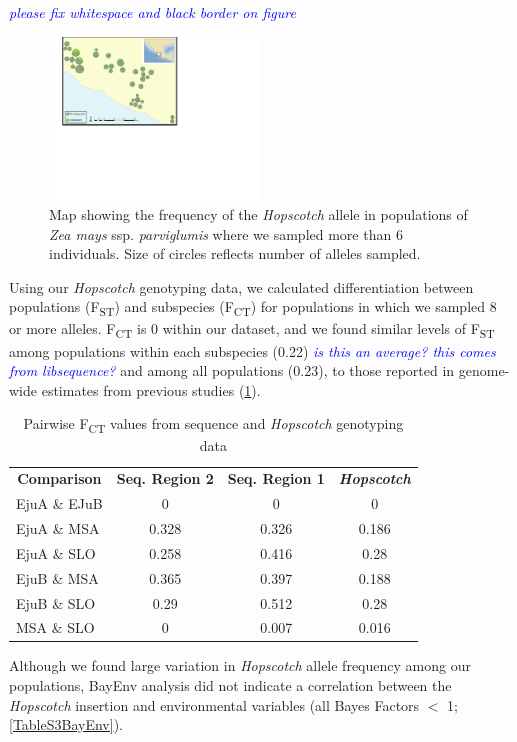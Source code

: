 \documentclass[11pt]{article}
\newcommand{\jri}[1]{\textcolor{blue}{ \emph{\scriptsize  #1}} }
\begin{document}
\begin{linenumbers}
\begin{flushleft}
\jri{please fix whitespace and black border on figure}
\begin{figure}[]
  \begin{center}
   \includegraphics[width=0.5\textwidth]{Fig1Map.pdf}
    \caption{Map showing the frequency of the \emph{Hopscotch} allele in populations of \emph{Zea mays} ssp. \emph{parviglumis} where we sampled more than 6 individuals. Size of circles reflects number of alleles sampled. } 
\label{Fig1Map}
  \end{center}
\end{figure}

Using our \emph{Hopscotch} genotyping data, we calculated differentiation between populations (F\textsubscript{ST}) and subspecies (F\textsubscript{CT}) for populations in which we sampled 8 or more alleles. F\textsubscript{CT} is 0 within our dataset, and we found similar levels of F\textsubscript{ST} among populations within each subspecies (0.22) \jri{is this an average? this comes from libsequence?} and among all populations (0.23), to those reported in genome-wide estimates from previous studies \cite{Pyhajarvi2013} (\ref{Table1Fst}). 

\begin{table}[htbp]
  \centering
  \caption{Pairwise F\textsubscript{CT} values from sequence and \emph{Hopscotch} genotyping data}
    \begin{tabular}{lccc}
    \multicolumn{1}{c}{\textbf{Comparison}} & \textbf{Seq. Region 2} & \textbf{Seq.  Region 1} & \textbf{\emph{Hopscotch}} \\
    EjuA \& EJuB & 0     & 0     & 0 \\
    EjuA \& MSA & 0.328 & 0.326 & 0.186 \\
    EjuA \& SLO & 0.258 & 0.416 & 0.28 \\
    EjuB \& MSA & 0.365 & 0.397 & 0.188 \\
    EjuB \& SLO & 0.29  & 0.512 & 0.28 \\
    MSA \& SLO & 0     & 0.007 & 0.016 \\
    \end{tabular}
  \label{Table1Fst}
\end{table}
Although we found large variation in \emph{Hopscotch} allele frequency among our populations, BayEnv analysis did not indicate a correlation between the \emph{Hopscotch} insertion and environmental variables (all Bayes Factors $<$ 1; \ref{TableS3BayEnv}). 


\end{flushleft}
\end{linenumbers}
\end{document}
